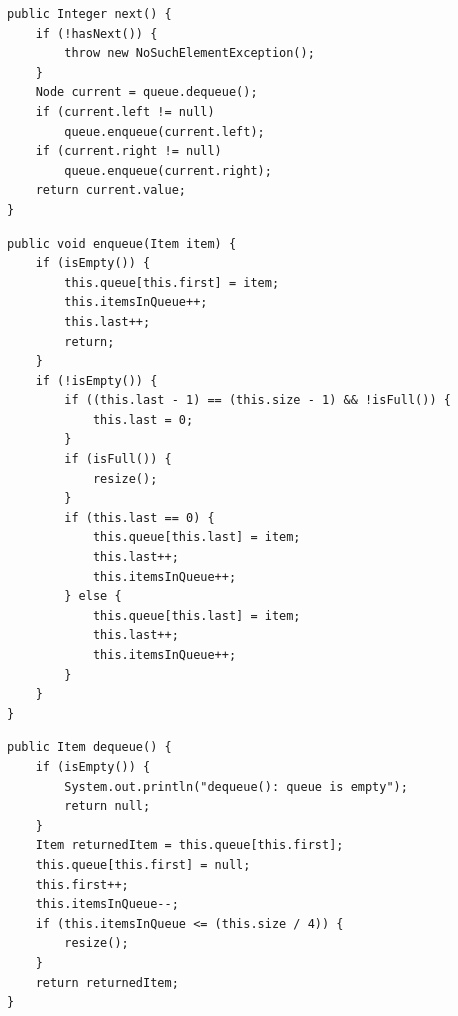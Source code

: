\documentclass[a4paper,11pt]{article}
\newenvironment{code}{\captionsetup{type=listing}}{}
\begin{document}
\begin{code}
    \label{code:iterator}
    \begin{verbatim}
public Integer next() {
    if (!hasNext()) {
        throw new NoSuchElementException();
    }
    Node current = queue.dequeue();
    if (current.left != null)
        queue.enqueue(current.left);
    if (current.right != null)
        queue.enqueue(current.right);
    return current.value;
}
\end{verbatim}
\end{code}

\begin{code}
    \label{code:arrayAdd}
    \begin{verbatim}
public void enqueue(Item item) {
    if (isEmpty()) {
        this.queue[this.first] = item;
        this.itemsInQueue++;
        this.last++;
        return;
    }
    if (!isEmpty()) {
        if ((this.last - 1) == (this.size - 1) && !isFull()) {
            this.last = 0;
        }
        if (isFull()) {
            resize();
        }
        if (this.last == 0) {
            this.queue[this.last] = item;
            this.last++;
            this.itemsInQueue++;
        } else {
            this.queue[this.last] = item;
            this.last++;
            this.itemsInQueue++;
        }
    }
}
\end{verbatim}
\end{code}

\begin{code}
    \label{code:arrarDequeue}
    \begin{verbatim}
public Item dequeue() {
    if (isEmpty()) {
        System.out.println("dequeue(): queue is empty");
        return null;
    }
    Item returnedItem = this.queue[this.first];
    this.queue[this.first] = null;
    this.first++;
    this.itemsInQueue--;
    if (this.itemsInQueue <= (this.size / 4)) {
        resize();
    }
    return returnedItem;
}
\end{verbatim}
\end{code}
\end{document}

